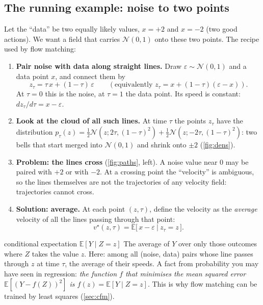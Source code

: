 \documentclass[11pt,a4paper]{article}
\newcommand{\E}{\mathbb{E}}
\newcommand{\N}{\mathcal{N}}
\begin{document}
\subsection{The running example: noise to two points}\label{sec:twopoint}
Let the ``data'' be two equally likely values, $x=+2$ and $x=-2$ (two good actions). We want a field that carries $\N(0,1)$ onto these two points. The recipe used by flow matching:
\begin{enumerate}
\item \textbf{Pair noise with data along straight lines.} Draw $\varepsilon\sim\N(0,1)$ and a data point $x$, and connect them by
\begin{equation}
z_\tau=\tau\,x+(1-\tau)\,\varepsilon\qquad(\text{equivalently } z_\tau=x+(1-\tau)(\varepsilon-x)).
\label{eq:interp}
\end{equation}
At $\tau=0$ this is the noise, at $\tau=1$ the data point. Its speed is constant: $dz_\tau/d\tau=x-\varepsilon$.
\item \textbf{Look at the cloud of all such lines.} At time $\tau$ the points $z_\tau$ have the distribution $p_\tau(z)=\tfrac12\N(z;2\tau,(1-\tau)^2)+\tfrac12\N(z;-2\tau,(1-\tau)^2)$: two bells that start merged into $\N(0,1)$ and shrink onto $\pm2$ (\cref{fig:dens}).
\item \textbf{Problem: the lines cross} (\cref{fig:paths}, left). A noise value near $0$ may be paired with $+2$ or with $-2$. At a crossing point the ``velocity'' is ambiguous, so the lines themselves are not the trajectories of any velocity field: trajectories cannot cross.
\item \textbf{Solution: average.} At each point $(z,\tau)$, define the velocity as the \emph{average} velocity of all the lines passing through that point:
\begin{equation}
v^\star(z,\tau)=\E\big[\,x-\varepsilon\ \big|\ z_\tau=z\,\big].
\label{eq:vstar}
\end{equation}
\end{enumerate}
\begin{newc}{conditional expectation $\E[Y\mid Z=z]$}
The average of $Y$ over only those outcomes where $Z$ takes the value $z$. Here: among all (noise, data) pairs whose line passes through $z$ at time $\tau$, the average of their speeds. A fact from probability you may have seen in regression: \emph{the function $f$ that minimises the mean squared error $\E[(Y-f(Z))^2]$ is $f(z)=\E[Y\mid Z=z]$}. This is why flow matching can be trained by least squares (\cref{sec:cfm}).
\end{newc}
\end{document}
